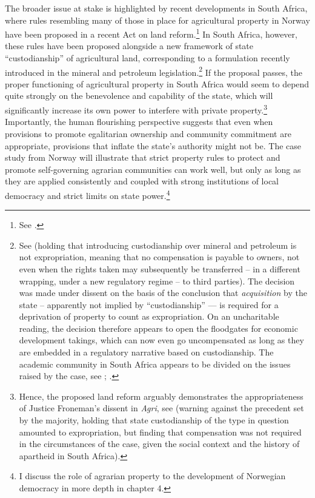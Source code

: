 {The broader issue at stake is highlighted by recent developments in South Africa, where rules resembling many of those in place for agricultural property in Norway have been proposed in a recent Act on land reform.\footnote{See \cite{steyn15}.} In South Africa, however, these rules have been proposed alongside a new framework of state ``custodianship'' of agricultural land, corresponding to a formulation recently introduced in the mineral and petroleum legislation.\footnote{See \cite{agri13} (holding that introducing custodianship over mineral and petroleum is not expropriation, meaning that no compensation is payable to owners, not even when the rights taken may subsequently be transferred --  in a different wrapping, under a new regulatory regime -- to third parties). The decision was made under dissent on the basis of the conclusion that {\it acquisition} by the state -- apparently not implied by ``custodianship'' --- is required for a deprivation of property to count as expropriation. On an uncharitable reading, the decision therefore appears to open the floodgates for economic development takings, which can now even go uncompensated as long as they are embedded in a regulatory narrative based on custodianship. The academic community in South Africa appears to be divided on the issues raised by the case, see \cite[428-451]{walt11}; \cite{marais15a,marais15b}.} If the proposal passes, the proper functioning of agricultural property in South Africa would seem to depend quite strongly on the benevolence and capability of the state, which will significantly increase its own power to interfere with private property.\footnote{Hence, the proposed land reform arguably demonstrates the appropriateness of Justice Froneman's dissent in {\it Agri}, see \cite[79-110]{agri13} (warning against the precedent set by the majority, holding that state custodianship of the type in question amounted to expropriation, but finding that compensation was not required in the circumstances of the case, given the social context and the history of apartheid in South Africa).} } Importantly, the human flourishing perspective suggests that even when provisions to promote egalitarian ownership and community commitment are appropriate, provisions that inflate the state's authority might not be. The case study from Norway will illustrate that strict property rules to protect and promote self-governing agrarian communities can work well, but only as long as they are applied consistently and coupled with strong institutions of local democracy and strict limits on state power.\footnote{I discuss the role of agrarian property to the development of Norwegian democracy in more depth in chapter 4.}

